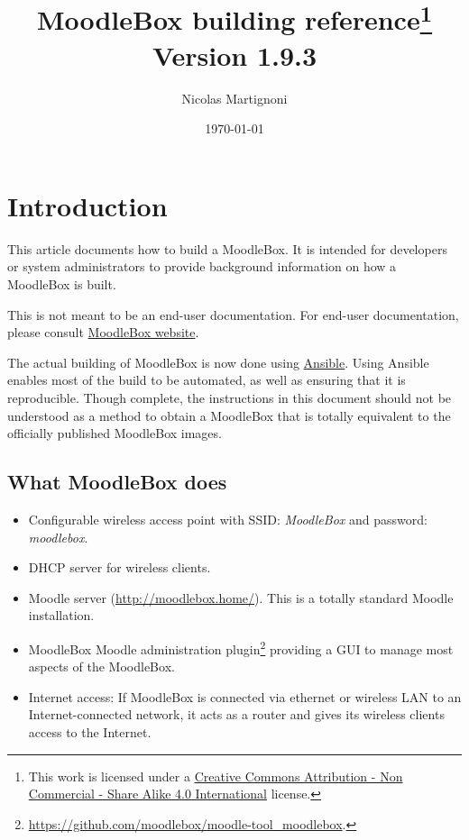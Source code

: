 \documentclass[12pt]{article}
\begin{document}
\title{MoodleBox building reference\footnote{This work is licensed under a \href{http://creativecommons.org/licenses/by-nc-sa/4.0/}{Creative Commons Attribution - Non Commercial - Share Alike  4.0 International} license.}\\
Version 1.9.3}
\date{\today} %
\author{Nicolas Martignoni}
\maketitle

\begingroup
\setlength{\parskip}{0pt}
\tableofcontents
\endgroup

\section{Introduction}

This article documents how to build a MoodleBox.
It is intended for developers or system administrators to provide background information on how a MoodleBox is built.

This is not meant to be an end-user documentation.
For end-user documentation, please consult \href{https://moodlebox.net/}{MoodleBox website}.

The actual building of MoodleBox is now done using \href{https://www.ansible.com/}{Ansible}.
Using Ansible enables most of the build to be automated, as well as ensuring that it is reproducible.
Though complete, the instructions in this document should not be understood as a method to obtain a MoodleBox that is totally equivalent to the officially published MoodleBox images.


\subsection{What MoodleBox does}

\begin{itemize}
\item Configurable wireless access point with SSID: \emph{MoodleBox} and password: \emph{moodlebox}.
\item DHCP server for wireless clients.
\item Moodle server (\url{http://moodlebox.home/}).
This is a totally standard Moodle installation.
\item MoodleBox Moodle administration plugin\footnote{\url{https://github.com/moodlebox/moodle-tool_moodlebox}.} providing a GUI to manage most aspects of the MoodleBox.
\item Internet access: If MoodleBox is connected via ethernet or wireless LAN to an Internet-connected network, it acts as a router and gives its wireless clients access to the Internet.
\end{itemize}
\end{document}
